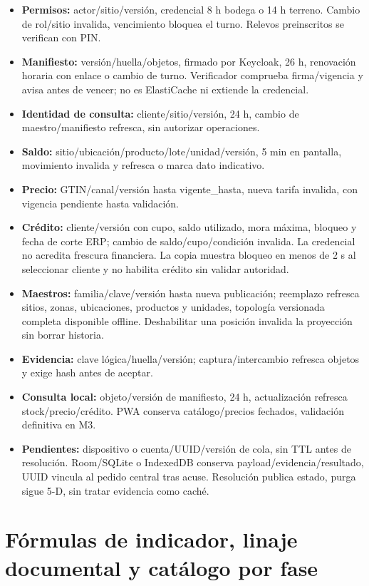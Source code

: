 \begin{itemize}
\item \textbf{Permisos:} actor/sitio/versión, credencial 8 h bodega o 14 h terreno. Cambio de rol/sitio invalida, vencimiento bloquea el turno. Relevos preinscritos se verifican con PIN.
\item \textbf{Manifiesto:} versión/huella/objetos, firmado por Keycloak, 26 h, renovación horaria con enlace o cambio de turno. Verificador comprueba firma/vigencia y avisa antes de vencer; no es ElastiCache ni extiende la credencial.
\item \textbf{Identidad de consulta:} cliente/sitio/versión, 24 h, cambio de maestro/manifiesto refresca, sin autorizar operaciones.
\item \textbf{Saldo:} sitio/ubicación/producto/lote/unidad/versión, 5 min en pantalla, movimiento invalida y refresca o marca dato indicativo.
\item \textbf{Precio:} GTIN/canal/versión hasta vigente\_hasta, nueva tarifa invalida, con vigencia pendiente hasta validación.
\item \textbf{Crédito:} cliente/versión con cupo, saldo utilizado, mora máxima, bloqueo y fecha de corte ERP; cambio de saldo/cupo/condición invalida. La credencial no acredita frescura financiera. La copia muestra bloqueo en menos de 2 s al seleccionar cliente y no habilita crédito sin validar autoridad.
\item \textbf{Maestros:} familia/clave/versión hasta nueva publicación; reemplazo refresca sitios, zonas, ubicaciones, productos y unidades, topología versionada completa disponible offline. Deshabilitar una posición invalida la proyección sin borrar historia.
\item \textbf{Evidencia:} clave lógica/huella/versión; captura/intercambio refresca objetos y exige hash antes de aceptar.
\item \textbf{Consulta local:} objeto/versión de manifiesto, 24 h, actualización refresca stock/precio/crédito. PWA conserva catálogo/precios fechados, validación definitiva en M3.
\item \textbf{Pendientes:} dispositivo o cuenta/UUID/versión de cola, sin TTL antes de resolución. Room/SQLite o IndexedDB conserva payload/evidencia/resultado, UUID vincula al pedido central tras acuse. Resolución publica estado, purga sigue 5-D, sin tratar evidencia como caché.
\end{itemize}

\section{Fórmulas de indicador, linaje documental y catálogo por fase}
\label{anexo-5h}

